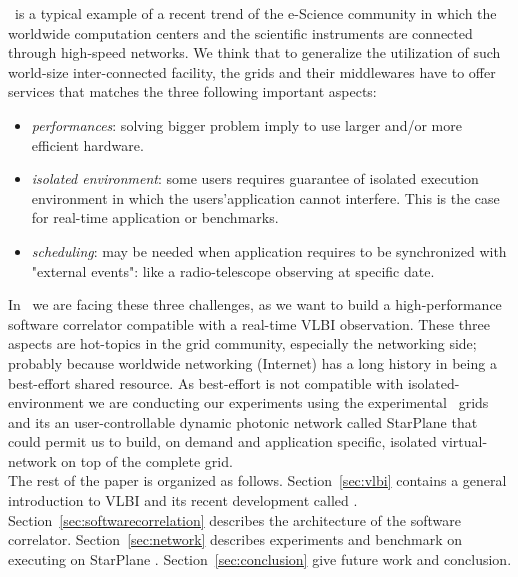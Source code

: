 \scarie\ is a typical example of a recent trend of the e-Science 
community in which the worldwide computation centers and the 
scientific instruments are connected through high-speed networks. We think that to 
generalize the utilization of such world-size inter-connected facility, 
the grids and their middlewares have to offer services that matches the three
following important aspects:
\begin{itemize}
\item \emph{performances}: solving bigger problem imply to use larger and/or
  more efficient hardware. 
\item \emph{isolated environment}: some users requires guarantee of isolated 
  execution environment in which the users'application cannot interfere. This is 
the case for real-time application or benchmarks.
\item \emph{scheduling}: may be needed when application requires to be synchronized
  with "external events": like a radio-telescope observing at specific date. 
\end{itemize}
In \scarie\ we are facing these three challenges, as we want to build a 
high-performance software correlator compatible with a real-time VLBI 
observation. These three aspects are hot-topics in the grid community,
especially the networking side; probably because worldwide networking (Internet) 
has a long history in being a best-effort shared resource. As best-effort 
is not compatible with isolated-environment we are conducting our 
experiments using the experimental \ grids and its an
user-controllable dynamic photonic network called StarPlane that could permit 
us to build, on demand and application specific, isolated virtual-network 
on top of the complete grid. \\


The rest of the paper is organized as follows. Section~\ref{sec:vlbi}
contains a general introduction to VLBI and its recent development 
called \evlbi. Section~\ref{sec:softwarecorrelation} describes the 
architecture of the software correlator. Section~\ref{sec:network} 
describes experiments and benchmark on executing \scarie on StarPlane 
. Section~\ref{sec:conclusion} give future work and conclusion.




